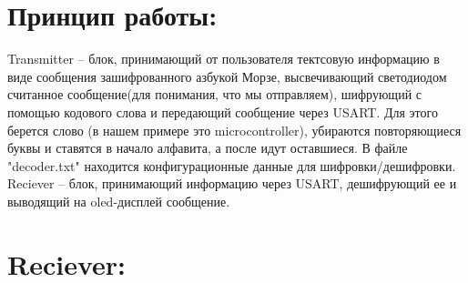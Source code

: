 \documentclass{article}
\begin{document}
\section{Принцип работы:}
Transmitter – блок, принимающий от пользователя тектсовую информацию в виде сообщения зашифрованного азбукой Морзе, высвечивающий светодиодом считанное сообщение(для понимания, что мы отправляем), шифрующий с помощью кодового слова и передающий сообщение через USART. Для этого берется слово (в нашем примере это microcontroller), убираются повторяющиеся буквы и ставятся в начало алфавита, а после идут оставшиеся. В файле "decoder.txt" находится конфигурационные данные для шифровки/дешифровки. 
Reciever – блок, принимающий информацию через USART, дешифрующий ее и выводящий на oled-дисплей сообщение.
\section{Reciever:}
	\begin{figure}[h!]
	\end{figure}
	\newpage
	\begin{figure}[h!]
	\end{figure}
	\newpage
	\begin{figure}[h!]
	\end{figure}
	\newpage
	\begin{figure}[h!]
	\end{figure}
	\newpage
	\begin{figure}[h!]
	\end{figure}
	\newpage
\end{document}

